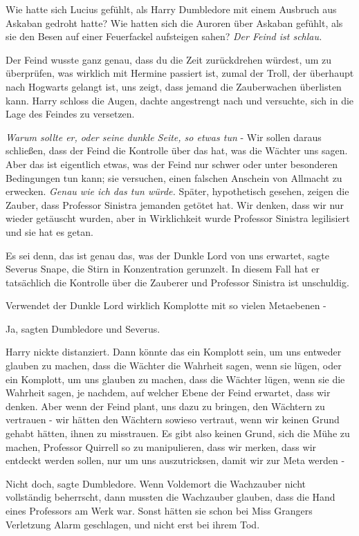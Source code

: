 Wie hatte sich Lucius gefühlt, als Harry Dumbledore mit einem Ausbruch aus
Askaban gedroht hatte? Wie hatten sich die Auroren über Askaban gefühlt, als sie
den Besen auf einer Feuerfackel aufsteigen sahen?
\emph{Der Feind ist schlau.}

\glqq{}Der Feind wusste ganz genau, dass du die Zeit zurückdrehen würdest, um zu
überprüfen, was wirklich mit Hermine passiert ist, zumal der Troll, der
überhaupt nach Hogwarts gelangt ist, uns zeigt, dass jemand die Zauberwachen
überlisten kann.\grqq{} Harry schloss die Augen, dachte angestrengt nach und
versuchte, sich in die Lage des Feindes zu versetzen.

\emph{Warum sollte er, oder seine dunkle Seite, so etwas tun} - \glqq{}Wir sollen
daraus schließen, dass der Feind die Kontrolle über das hat, was die Wächter uns
sagen. Aber das ist eigentlich etwas, was der Feind nur schwer oder unter
besonderen Bedingungen tun kann; sie versuchen, einen falschen Anschein von
Allmacht zu erwecken.\grqq{}
\emph{Genau wie ich das tun würde.}
\glqq{}Später, hypothetisch gesehen, zeigen die Zauber, dass Professor Sinistra
jemanden getötet hat. Wir denken, dass wir nur wieder getäuscht wurden, aber in
Wirklichkeit wurde Professor Sinistra legilisiert und sie hat es getan.\grqq{}

\glqq{}Es sei denn, das ist genau das, was der Dunkle Lord von uns
erwartet\grqq{}, sagte Severus Snape, die Stirn in Konzentration gerunzelt.
\glqq{}In diesem Fall hat er tatsächlich die Kontrolle über die Zauberer und
Professor Sinistra ist unschuldig.\grqq{}

\glqq{}Verwendet der Dunkle Lord wirklich Komplotte mit so vielen Metaebenen
-\grqq{}

\glqq{}Ja\grqq{}, sagten Dumbledore und Severus.

Harry nickte distanziert. \glqq{}Dann könnte das ein Komplott sein, um uns
entweder glauben zu machen, dass die Wächter die Wahrheit sagen, wenn sie lügen,
oder ein Komplott, um uns glauben zu machen, dass die Wächter lügen, wenn sie
die Wahrheit sagen, je nachdem, auf welcher Ebene der Feind erwartet, dass wir
denken. Aber wenn der Feind plant, uns dazu zu bringen, den Wächtern zu
vertrauen - wir hätten den Wächtern sowieso vertraut, wenn wir keinen Grund
gehabt hätten, ihnen zu misstrauen. Es gibt also keinen Grund, sich die Mühe zu
machen, Professor Quirrell so zu manipulieren, dass wir merken, dass wir
entdeckt werden sollen, nur um uns auszutricksen, damit wir zur Meta werden
-\grqq{}

\glqq{}Nicht doch\grqq{}, sagte Dumbledore. \glqq{}Wenn Voldemort die Wachzauber
nicht vollständig beherrscht, dann mussten die Wachzauber glauben, dass die Hand
eines Professors am Werk war. Sonst hätten sie schon bei Miss Grangers
Verletzung Alarm geschlagen, und nicht erst bei ihrem Tod.\grqq{}

